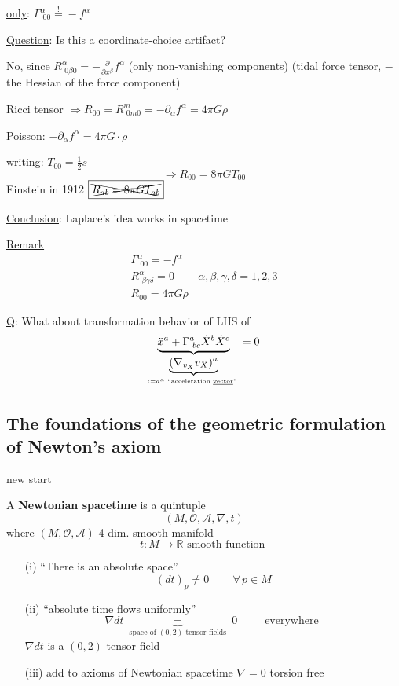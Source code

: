 \underline{only}: $\boxed{ \Gamma^{\alpha}_{ \, \, 00} \overset{!}{=} -f^{\alpha}}$

\underline{Question}: Is this a coordinate-choice artifact?

No, since $R^{\alpha}_{ \, \, 0\beta 0} = - \frac{ \partial }{ \partial x^{\beta}} f^{\alpha}$ (only non-vanishing components) (tidal force tensor, $-$ the Hessian of the force component)

Ricci tensor $\Longrightarrow  R_{00} = R^m_{ \, \, 0m0} = -\partial_{\alpha} f^{\alpha} = 4\pi G \rho$
 
Poisson: $-\partial_{\alpha}f^{\alpha} = 4\pi G\cdot \rho$

\underline{writing}: $T_{00} = \frac{1}{2}s$ 
\[
\Longrightarrow \boxed{ R_{00} = 8 \pi G T_{00} }
\]
Einstein in 1912 $ \boxed{ \xcancel{ R_{ab} = 8\pi G T_{ab} }}$


\underline{Conclusion}: Laplace's idea works in spacetime

\underline{Remark} 
\[
\begin{gathered}
  \Gamma^{\alpha}_{ \, \, 00 } = -f^{\alpha} \\ 
  R^{\alpha}_{ \, \, \beta \gamma \delta } = 0 \quad \quad \, \alpha, \beta , \gamma, \delta = 1,2,3 \\
  \boxed{ R_{00} = 4\pi G \rho }
\end{gathered}
\]

\underline{Q}: What about transformation behavior of LHS of 
\[
\underbrace{ \ddot{x}^a + \Gamma^a_{ \, \, bc } \dot{X}^b \dot{X}^c}_{ \underbrace{ (\nabla_{v_X}v_X)^a}_{ := a^a \text{ ``acceleration \underline{vector}'' } } } = 0
\]

\subsection{The foundations of the geometric formulation of Newton's axiom}

new start
\begin{definition}
A \textbf{Newtonian spacetime} is a quintuple \[
(M , \mathcal{O}, \mathcal{A}, \nabla , t)
\]
where $(M,\mathcal{O}, \mathcal{A})$ 4-dim. smooth manifold
\[
t: M \to \mathbb{R} \text{ smooth function }
\]

\begin{enumerate}
  \item[(i)] ``There is an absolute space''
\[
(dt)_p \neq 0 \quad \quad \, \forall \, p \in M 
\]
    \item[(ii)] ``absolute time flows uniformly''
\[
\nabla dt \underbrace{=}_{ \text{ space of $(0,2)$-tensor fields } }  0 \quad \quad \, \text{ everywhere }
\]
$\nabla dt $ is a $(0,2)$-tensor field
\item[(iii)] add to axioms of Newtonian spacetime 
$\nabla = 0$ torsion free
\end{enumerate}
\end{definition}

